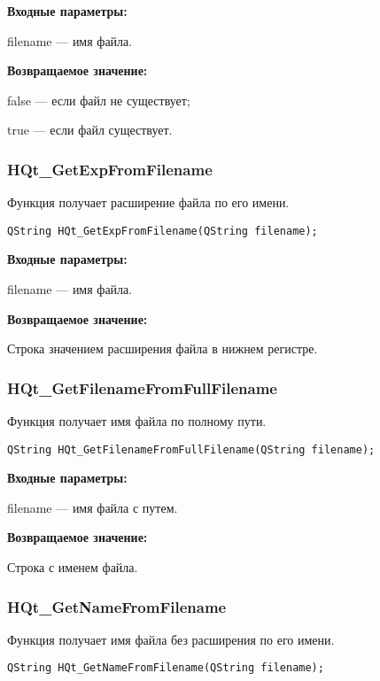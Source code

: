 \documentclass[a4paper,12pt]{article}
\begin{document}
\textbf{Входные параметры:}

filename --- имя файла.

\textbf{Возвращаемое значение:}

false --- если файл не существует;

true --- если файл существует.


\subsubsection{HQt\_GetExpFromFilename}\label{HQt_GetExpFromFilename}

Функция получает расширение файла по его имени.


\begin{lstlisting}[label=code_syntax_HQt_GetExpFromFilename,caption=Синтаксис]
QString HQt_GetExpFromFilename(QString filename);
\end{lstlisting}

\textbf{Входные параметры:}
 
filename --- имя файла.

\textbf{Возвращаемое значение:}

Строка значением расширения файла в нижнем регистре.


\subsubsection{HQt\_GetFilenameFromFullFilename}\label{HQt_GetFilenameFromFullFilename}

Функция получает имя файла по полному пути.


\begin{lstlisting}[label=code_syntax_HQt_GetFilenameFromFullFilename,caption=Синтаксис]
QString HQt_GetFilenameFromFullFilename(QString filename);
\end{lstlisting}

\textbf{Входные параметры:}
 
filename --- имя файла с путем.

\textbf{Возвращаемое значение:}

Строка с именем файла.


\subsubsection{HQt\_GetNameFromFilename}\label{HQt_GetNameFromFilename}

Функция получает имя файла без расширения по его имени.


\begin{lstlisting}[label=code_syntax_HQt_GetNameFromFilename,caption=Синтаксис]
QString HQt_GetNameFromFilename(QString filename);
\end{lstlisting}
\end{document}
